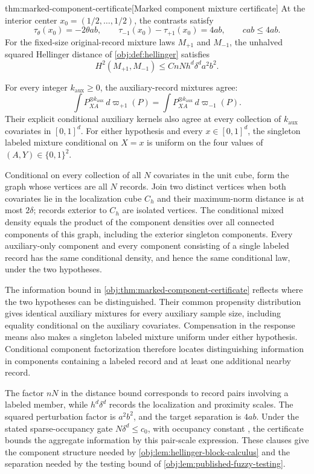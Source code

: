 \documentclass[11pt]{article}
\begin{document}
\begin{theoremv}{thm:marked-component-certificate}[Marked component mixture certificate]
At the interior center \(x_0=(1/2,\ldots,1/2)\), the contrasts satisfy
\[
\tau_\theta(x_0)=-2\theta ab,
\qquad
\tau_{-1}(x_0)-\tau_{+1}(x_0)=4ab,
\qquad
cab\le4ab.
\]
For the fixed-size original-record mixture laws \(M_{+1}\) and \(M_{-1}\), the unhalved squared Hellinger distance of \cref{obj:def:hellinger} satisfies
\[
H^2(M_{+1},M_{-1})
\le CnNh^d\delta^da^2b^2.
\]

For every integer \(k_{\mathrm{aux}}\ge0\), the auxiliary-record mixtures agree:
\[
\int P_{XA}^{\otimes k_{\mathrm{aux}}}\,d\varpi_{+1}(P)
=
\int P_{XA}^{\otimes k_{\mathrm{aux}}}\,d\varpi_{-1}(P).
\]
Their explicit conditional auxiliary kernels also agree at every collection of \(k_{\mathrm{aux}}\) covariates in \([0,1]^d\). For either hypothesis and every \(x\in[0,1]^d\), the singleton labeled mixture conditional on \(X=x\) is uniform on the four values of \((A,Y)\in\{0,1\}^2\).

Conditional on every collection of all \(N\) covariates in the unit cube, form the graph whose vertices are all \(N\) records. Join two distinct vertices when both covariates lie in the localization cube \(C_h\) and their maximum-norm distance is at most \(2\delta\); records exterior to \(C_h\) are isolated vertices. The conditional mixed density equals the product of the component densities over all connected components of this graph, including the exterior singleton components. Every auxiliary-only component and every component consisting of a single labeled record has the same conditional density, and hence the same conditional law, under the two hypotheses.
\end{theoremv}

The information bound in \cref{obj:thm:marked-component-certificate} reflects where the two hypotheses can be distinguished. Their common propensity distribution gives identical auxiliary mixtures for every auxiliary sample size, including equality conditional on the auxiliary covariates. Compensation in the response means also makes a singleton labeled mixture uniform under either hypothesis. Conditional component factorization therefore locates distinguishing information in components containing a labeled record and at least one additional nearby record.

The factor \(nN\) in the distance bound corresponds to record pairs involving a labeled member, while \(h^d\delta^d\) records the localization and proximity scales. The squared perturbation factor is \(a^2b^2\), and the target separation is \(4ab\). Under the stated sparse-occupancy gate \(N\delta^d\le c_0\), with occupancy constant , the certificate bounds the aggregate information by this pair-scale expression. These clauses give the component structure needed by \cref{obj:lem:hellinger-block-calculus} and the separation needed by the testing bound of \cref{obj:lem:published-fuzzy-testing}.
\end{document}
